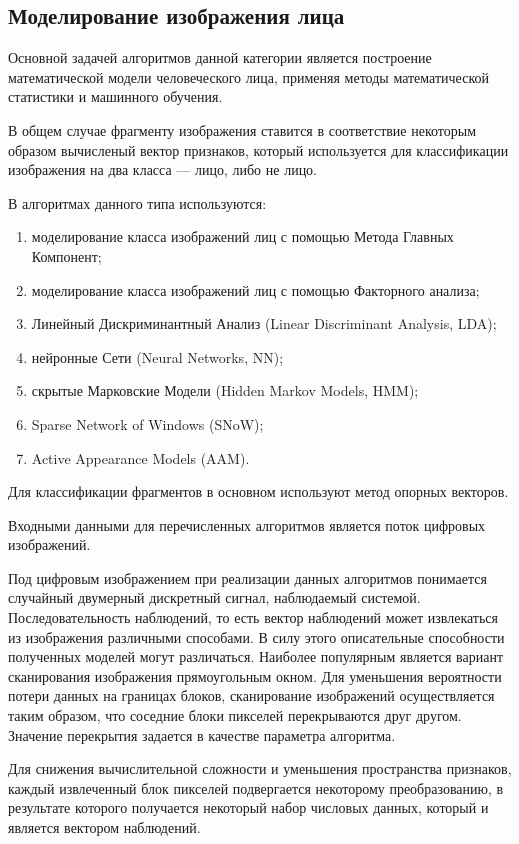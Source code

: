 \subsection{Моделирование изображения лица}
Основной задачей алгоритмов данной категории является построение математической
модели человеческого лица, применяя методы математической статистики и
машинного обучения.

В общем случае фрагменту изображения ставится в соответствие некоторым образом
вычисленый вектор признаков, который используется для классификации изображения
на два класса --- лицо, либо не лицо.

В алгоритмах данного типа используются:
\begin{enumerate}
  \item моделирование класса изображений лиц с помощью Метода Главных Компонент;
  \item моделирование класса изображений лиц с помощью Факторного анализа;
  \item Линейный Дискриминантный Анализ (Linear Discriminant Analysis, LDA);
  \item нейронные Сети (Neural Networks, NN);
  \item скрытые Марковские Модели (Hidden Markov Models, HMM);
  \item Sparse Network of Windows (SNoW);
  \item Active Appearance Models (AAM).
\end{enumerate}

Для классификации фрагментов в основном используют метод опорных векторов.

Входными данными для перечисленных алгоритмов является поток цифровых
изображений.

Под цифровым изображением при реализации данных алгоритмов понимается случайный
двумерный дискретный сигнал, наблюдаемый системой. Последовательность
наблюдений, то есть вектор наблюдений может извлекаться из изображения
различными способами. В силу этого описательные способности полученных моделей
могут различаться. Наиболее популярным является вариант сканирования изображения
прямоугольным окном. Для уменьшения вероятности потери данных на границах
блоков, сканирование изображений осуществляется таким образом, что соседние
блоки пикселей перекрываются друг другом. Значение перекрытия задается в
качестве параметра алгоритма.

Для снижения вычислительной сложности и уменьшения пространства признаков,
каждый извлеченный блок пикселей подвергается некоторому преобразованию, в
результате которого получается некоторый набор числовых данных, который и
является вектором наблюдений.

